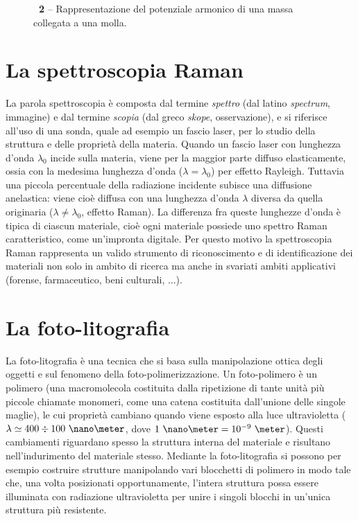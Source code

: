 \begin{figure}[!t]
\begin{center}
\caption{\textbf{\figurename~2} -- Rappresentazione del potenziale armonico di una massa collegata a una molla.}
\label{fig:ar}
\end{center}
\vskip-20pt
\end{figure}

\section*{La spettroscopia Raman}
La parola spettroscopia è composta dal termine \emph{spettro} (dal latino \textit{spectrum}, immagine) e dal termine \emph{scopia} (dal greco \textit{skope}, osservazione), e si riferisce all'uso di una sonda, quale ad esempio un fascio laser, per lo studio della struttura e delle proprietà della materia.
Quando un fascio laser con lunghezza d'onda $\lambda_0$ incide sulla materia, viene per la maggior parte diffuso elasticamente, ossia con la medesima lunghezza d'onda ($\lambda=\lambda_0$) per effetto Rayleigh. Tuttavia una piccola percentuale della radiazione incidente subisce una diffusione anelastica: viene cioè diffusa con una lunghezza d'onda $\lambda$ diversa da quella originaria ($\lambda\neq\lambda_0$, effetto Raman). La differenza fra queste lunghezze d'onda è tipica di ciascun materiale, cioè ogni materiale possiede uno spettro Raman caratteristico, come un'impronta digitale. Per questo motivo la spettroscopia Raman rappresenta un valido strumento di riconoscimento e di identificazione dei materiali  non solo in ambito di ricerca ma anche in svariati ambiti applicativi (forense, farmaceutico, beni culturali, ...).

\section*{La foto-litografia}
La foto-litografia è una tecnica che si basa sulla manipolazione ottica degli oggetti e sul fenomeno della foto-polimerizzazione. Un foto-polimero è un polimero (una macromolecola costituita dalla ripetizione di tante unità più piccole chiamate monomeri, come una catena costituita dall'unione delle singole maglie), le cui proprietà cambiano quando viene esposto alla luce ultravioletta ($\lambda \simeq 400\div100~\nano\meter$, dove $1~\nano\meter = 10^{-9}~\meter$). Questi cambiamenti riguardano spesso la struttura interna del materiale e risultano nell'indurimento del materiale stesso.
Mediante la foto-litografia si possono per esempio costruire strutture manipolando vari blocchetti di polimero in modo tale che, una volta posizionati opportunamente, l'intera struttura possa essere illuminata con radiazione ultravioletta per unire i singoli blocchi in un'unica struttura più resistente.  %

